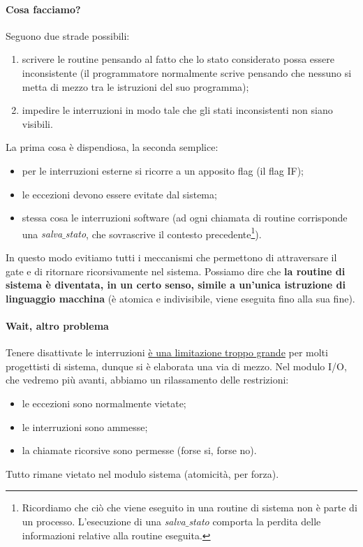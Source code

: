 \paragraph{Cosa facciamo?} Seguono due strade possibili:
\begin{enumerate}
	\item scrivere le routine pensando al fatto che lo stato considerato possa essere inconsistente (il programmatore normalmente scrive pensando che nessuno si metta di mezzo tra le istruzioni del suo programma);
	\item impedire le interruzioni in modo tale che gli stati inconsistenti non siano visibili.
\end{enumerate}
La prima cosa è dispendiosa, la seconda semplice:
\begin{itemize}
	\item per le interruzioni esterne si ricorre a un apposito flag (il flag IF);
	\item le eccezioni devono essere evitate dal sistema;
	\item stessa cosa le interruzioni software (ad ogni chiamata di routine corrisponde una \emph{salva$\_$stato}, che sovrascrive il contesto precedente\footnote{Ricordiamo che ciò che viene eseguito in una routine di sistema non è parte di un processo. L'esecuzione di una \emph{salva$\_$stato} comporta la perdita delle informazioni relative alla routine eseguita.}).
\end{itemize}
In questo modo evitiamo tutti i meccanismi che permettono di attraversare il gate e di ritornare ricorsivamente nel sistema. Possiamo dire che \textbf{la routine di sistema è diventata, in un certo senso, simile a un'unica istruzione di linguaggio macchina} (è atomica e indivisibile, viene eseguita fino alla sua fine). 

\paragraph{Wait, altro problema} Tenere disattivate le interruzioni \underline{è una limitazione troppo grande} per molti progettisti di sistema, dunque si è elaborata una via di mezzo. Nel modulo I/O, che vedremo più avanti, abbiamo un rilassamento delle restrizioni:
\begin{itemize}
	\item le eccezioni sono normalmente vietate;
	\item le interruzioni sono ammesse;
	\item la chiamate ricorsive sono permesse (forse si, forse no).
\end{itemize}
Tutto rimane vietato nel modulo sistema (atomicità, per forza).

